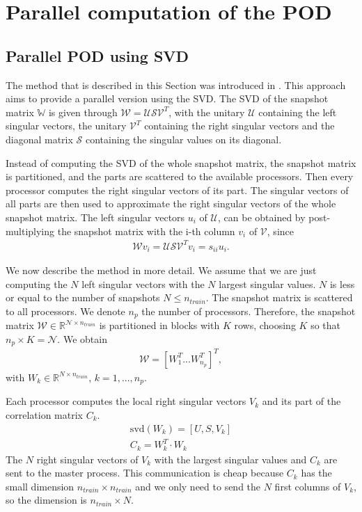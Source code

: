 \chapter{Parallel computation of the POD}

\section{Parallel POD using SVD}
\label{sec:paraSVD}

The method that is described in this Section was introduced in \cite{parapod}. 
This approach aims to provide a parallel version using the SVD.
The SVD of the snapshot matrix $\mathbb{W}$ is given through $\mathcal{ W } = \mathcal{ USV}^T $, with the unitary $\mathcal{U}$ containing the left singular vectors, the unitary $\mathcal{V}^T$ containing the right singular vectors and the diagonal matrix $\mathcal{ S }$ containing the singular values on its diagonal.

Instead of computing the SVD of the whole snapshot matrix, the snapshot matrix is partitioned, and the parts are scattered to the available processors.
Then every processor computes the right singular vectors of its part.
The singular vectors of all parts are then used to approximate the right singular vectors of the whole snapshot matrix.
The left singular vectors $u_i$ of $\mathcal{U}$, can be obtained by post-multiplying the snapshot matrix with the i-th column $v_i$ of $\mathcal{V}$, since 
\begin{align}
\label{eq:leftSV}
\mathcal{W} v_i= \mathcal{ USV}^T v_i = s_{ii}u_i.
\end{align}

We now describe the method in more detail.
We assume that we are just computing the $N$ left singular vectors with the $N$ largest singular values. $N$ is less or equal to the number of snapshots $N \leq n_{train}$.
The snapshot matrix is scattered to all processors. We denote $n_p$ the number of processors.
Therefore, the snapshot matrix  $\mathcal{W} \in \mathbb{R}^{\mathcal{ N } \times n_{train}}$ is partitioned in blocks with $K$ rows, choosing $K$ so that $n_p \times K = \mathcal{ N }$. We obtain 
\begin{align*}
\mathcal{W} = [W_1^T ... W_{n_p}^T]^T,
\end{align*}
with $W_k \in \mathbb{R}^{N \times n_{train}}$, $k=1,...,n_p$.  

Each processor computes the local right singular vectors $V_k$ and its part of the correlation matrix $C_k$.
\begin{align}
\text{svd}(W_k) = [ U,S,V_k]\\
C_k = W_k^T \cdot W_k 
\label{eq:corr1}
\end{align}
The $N$ right singular vectors of $V_k$ with the largest singular values and $C_k$ are sent to the master process. This communication is cheap because $C_k$ has the small dimension $n_{train}\times n_{train}$ and we only need to send the $N$ first columns of $V_k$, so the dimension is $n_{train}\times N$. 

